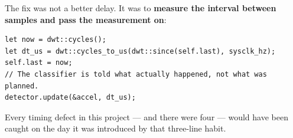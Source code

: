 The fix was not a better delay. It was to \textbf{measure the interval between samples and pass the
measurement on}:

\begin{verbatim}
let now = dwt::cycles();
let dt_us = dwt::cycles_to_us(dwt::since(self.last), sysclk_hz);
self.last = now;
// The classifier is told what actually happened, not what was planned.
detector.update(&accel, dt_us);
\end{verbatim}

Every timing defect in this project — and there were four — would have been caught on the day it was
introduced by that three-line habit.
